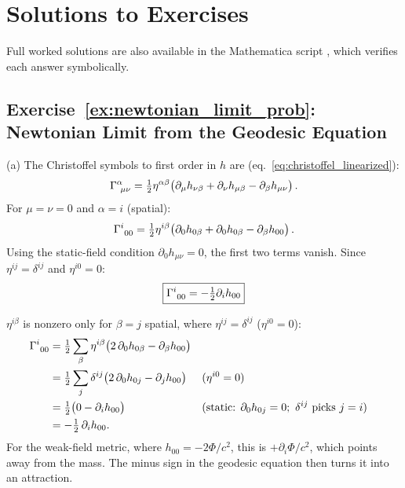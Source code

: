 
\section{Solutions to Exercises}
\label{sec:linearized_solutions}

\noindent
Full worked solutions are also available in the Mathematica script
,
which verifies each answer symbolically.

\subsection*{Exercise~\ref{ex:newtonian_limit_prob}: Newtonian Limit from the Geodesic Equation}

(a) The Christoffel symbols to first order in $h$ are
(eq.~\eqref{eq:christoffel_linearized}):
\[
    \Gamma^{\alpha}_{\ \mu \nu}
    = \tfrac{1}{2} \eta^{\alpha\beta}\bigl(
    \partial_\mu h_{\nu\beta} + \partial_\nu h_{\mu\beta}
    - \partial_\beta h_{\mu\nu}\bigr) \,.
\]
For $\mu = \nu = 0$ and $\alpha = i$ (spatial):
\[
    \Gamma^{i}_{\ 0 0}
    = \tfrac{1}{2} \eta^{i\beta}\bigl(
    \partial_0 h_{0\beta} + \partial_0 h_{0\beta}
    - \partial_\beta h_{00}\bigr) \,.
\]
Using the static-field condition $\partial_0 h_{\mu\nu} = 0$,
the first two terms vanish.  Since $\eta^{ij} = \delta^{ij}$ and
$\eta^{i0} = 0$:
\[
    \boxed{\Gamma^{i}_{\ 0 0} = -\tfrac{1}{2} \partial_i h_{00}}
\]

\begin{derivation}
$\eta^{i\beta}$ is nonzero only for $\beta = j$ spatial, where
$\eta^{ij} = \delta^{ij}$ ($\eta^{i0} = 0$):
\begin{align*}
\Gamma^{i}_{\ 0 0}
&= \tfrac12\sum_{\beta}\eta^{i\beta}\bigl(2\,\partial_0 h_{0\beta} - \partial_\beta h_{00}\bigr) \\
&= \tfrac12\sum_{j}\delta^{ij}\bigl(2\,\partial_0 h_{0j} - \partial_j h_{00}\bigr)
  && (\eta^{i0} = 0) \\
&= \tfrac12\bigl(0 - \partial_i h_{00}\bigr)
  && (\text{static: } \partial_0 h_{0j} = 0;\ \delta^{ij} \text{ picks } j = i) \\
&= -\tfrac12\,\partial_i h_{00} .
\end{align*}
For the weak-field metric, where $h_{00} = -2\Phi/c^2$, this is
$+\partial_i\Phi/c^2$, which points away from the mass.  The minus sign in
the geodesic equation then turns it into an attraction.
\end{derivation}


